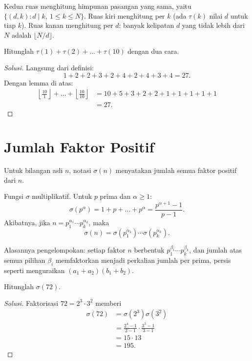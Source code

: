 \documentclass[12pt]{scrartcl}
\begin{document}
Kedua ruas menghitung himpunan pasangan yang sama, yaitu
$\{(d, k) : d \mid k,\ 1 \le k \le N\}$.
Ruas kiri menghitung per $k$ (ada $\tau(k)$ nilai $d$ untuk tiap $k$).
Ruas kanan menghitung per $d$: banyak kelipatan $d$ yang tidak lebih dari $N$
adalah $\lfloor N/d \rfloor$.

\begin{example}
Hitunglah $\tau(1) + \tau(2) + \dots + \tau(10)$ dengan dua cara.
\end{example}
\begin{proof}[Solusi]
Langsung dari definisi:
\[ 1 + 2 + 2 + 3 + 2 + 4 + 2 + 4 + 3 + 4 = 27. \]
Dengan lemma di atas:
\begin{align*}
\left\lfloor \frac{10}{1} \right\rfloor + \dots + \left\lfloor \frac{10}{10} \right\rfloor
&= 10 + 5 + 3 + 2 + 2 + 1 + 1 + 1 + 1 + 1 \\
&= 27.
\end{align*}
\end{proof}

\section{Jumlah Faktor Positif}

\begin{definition}
Untuk bilangan asli $n$, notasi $\sigma(n)$ menyatakan jumlah semua faktor
positif dari $n$.
\end{definition}

\begin{theorem}
Fungsi $\sigma$ multiplikatif. Untuk $p$ prima dan $\alpha \ge 1$:
\[ \sigma(p^\alpha) = 1 + p + \dots + p^\alpha = \frac{p^{\alpha+1} - 1}{p - 1}. \]
Akibatnya, jika $n = p_1^{\alpha_1} \cdots p_k^{\alpha_k}$, maka
\[ \sigma(n) = \sigma(p_1^{\alpha_1}) \cdots \sigma(p_k^{\alpha_k}). \]
\end{theorem}

Alasannya pengelompokan: setiap faktor $n$ berbentuk $p_1^{\beta_1} \cdots p_k^{\beta_k}$,
dan jumlah atas semua pilihan $\beta_i$ memfaktorkan menjadi perkalian
jumlah per prima, persis seperti menguraikan $(a_1 + a_2)(b_1 + b_2)$.

\begin{example}
Hitunglah $\sigma(72)$.
\end{example}
\begin{proof}[Solusi]
Faktorisasi $72 = 2^3 \cdot 3^2$ memberi
\begin{align*}
\sigma(72) &= \sigma(2^3)\sigma(3^2) \\
&= \frac{2^4 - 1}{2 - 1} \cdot \frac{3^3 - 1}{3 - 1} \\
&= 15 \cdot 13 \\
&= 195.
\end{align*}
\end{proof}
\end{document}
